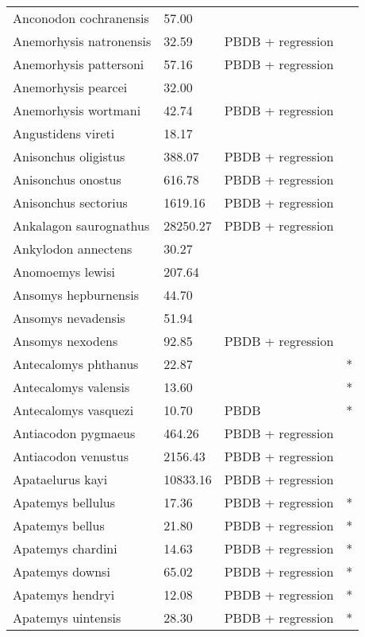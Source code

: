 \documentclass{article}
\begin{document}
\begin{center}
\begin{longtable}{p{} p{} p{} p{}}
    Anconodon cochranensis & 57.00 & \cite{Wilson2012} &  \\ 
    Anemorhysis natronensis & 32.59 & PBDB + regression &  \\ 
    Anemorhysis pattersoni & 57.16 & PBDB + regression &  \\ 
    Anemorhysis pearcei & 32.00 & \cite{Albright2000} &  \\ 
    Anemorhysis wortmani & 42.74 & PBDB + regression &  \\ 
    Angustidens vireti & 18.17 & \cite{Tomiya2013} &  \\ 
    Anisonchus oligistus & 388.07 & PBDB + regression &  \\ 
    Anisonchus onostus & 616.78 & PBDB + regression &  \\ 
    Anisonchus sectorius & 1619.16 & PBDB + regression &  \\ 
    Ankalagon saurognathus & 28250.27 & PBDB + regression &  \\ 
    Ankylodon annectens & 30.27 & \cite{Tomiya2013} &  \\ 
    Anomoemys lewisi & 207.64 & \cite{Simons1960} &  \\ 
    Ansomys hepburnensis & 44.70 & \cite{Tomiya2013} &  \\ 
    Ansomys nevadensis & 51.94 & \cite{Tomiya2013} &  \\ 
    Ansomys nexodens & 92.85 & PBDB + regression &  \\ 
    Antecalomys phthanus & 22.87 & \cite{Tomiya2013} & * \\ 
    Antecalomys valensis & 13.60 & \cite{Tomiya2013} & * \\ 
    Antecalomys vasquezi & 10.70 & PBDB & * \\ 
    Antiacodon pygmaeus & 464.26 & PBDB + regression &  \\ 
    Antiacodon venustus & 2156.43 & PBDB + regression &  \\ 
    Apataelurus kayi & 10833.16 & PBDB + regression &  \\ 
    Apatemys bellulus & 17.36 & PBDB + regression & * \\ 
    Apatemys bellus & 21.80 & PBDB + regression & * \\ 
    Apatemys chardini & 14.63 & PBDB + regression & * \\ 
    Apatemys downsi & 65.02 & PBDB + regression & * \\ 
    Apatemys hendryi & 12.08 & PBDB + regression & * \\ 
    Apatemys uintensis & 28.30 & PBDB + regression & * \\ 

\end{longtable}
\end{center}
\end{document}
